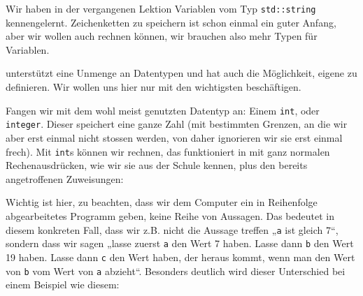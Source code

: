 
Wir haben in der vergangenen Lektion Variablen vom Typ \texttt{std::string}
kennengelernt. Zeichenketten zu speichern ist schon einmal ein guter Anfang,
aber wir wollen auch rechnen können, wir brauchen also mehr Typen für
Variablen.

\Cpp unterstützt eine Unmenge an Datentypen und hat auch die Möglichkeit,
eigene zu definieren. Wir wollen uns hier nur mit den wichtigsten beschäftigen.

Fangen wir mit dem wohl meist genutzten Datentyp an: Einem \texttt{int}, oder
\texttt{integer}. Dieser speichert eine ganze Zahl (mit bestimmten Grenzen, an
die wir aber erst einmal nicht stossen werden, von daher ignorieren wir sie
erst einmal frech). Mit \texttt{int}s können wir rechnen, das funktioniert in
\Cpp mit ganz normalen Rechenausdrücken, wie wir sie aus der Schule kennen,
plus den bereits angetroffenen Zuweisungen:


Wichtig ist hier, zu beachten, dass wir dem Computer ein in Reihenfolge
abgearbeitetes Programm geben, keine Reihe von Aussagen. Das bedeutet in diesem
konkreten Fall, dass wir z.B. nicht die Aussage treffen „\texttt{a} ist gleich
7“, sondern dass wir sagen „lasse zuerst \texttt{a} den Wert 7 haben. Lasse
dann \texttt{b} den Wert 19 haben. Lasse dann \texttt{c} den Wert haben, der
heraus kommt, wenn man den Wert von \texttt{b} vom Wert von \texttt{a}
abzieht“. Besonders deutlich wird dieser Unterschied bei einem Beispiel wie
diesem:


